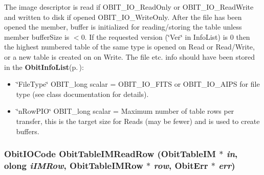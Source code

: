 The image descriptor is read if OBIT\_\-IO\_\-Read\-Only or OBIT\_\-IO\_\-Read\-Write and written to disk if opened OBIT\_\-IO\_\-Write\-Only. After the file has been opened the member, buffer is initialized for reading/storing the table unless member buffer\-Size is $<$0. If the requested version (\char`\"{}Ver\char`\"{} in Info\-List) is 0 then the highest numbered table of the same type is opened on Read or Read/Write, or a new table is created on on Write. The file etc. info should have been stored in the {\bf Obit\-Info\-List}{\rm (p.\,\pageref{structObitInfoList})}: \begin{itemize}
\item \char`\"{}File\-Type\char`\"{} OBIT\_\-long scalar = OBIT\_\-IO\_\-FITS or OBIT\_\-IO\_\-AIPS for file type (see class documentation for details). \item \char`\"{}n\-Row\-PIO\char`\"{} OBIT\_\-long scalar = Maximum number of table rows per transfer, this is the target size for Reads (may be fewer) and is used to create buffers. 
\end{itemize}
\subsubsection{\setlength{\rightskip}{0pt plus 5cm}Obit\-IOCode Obit\-Table\-IMRead\-Row ({\bf Obit\-Table\-IM} $\ast$ {\em in}, {\bf olong} {\em i\-IMRow}, {\bf Obit\-Table\-IMRow} $\ast$ {\em row}, {\bf Obit\-Err} $\ast$ {\em err})}\label{ObitTableIM_8h_a18}


